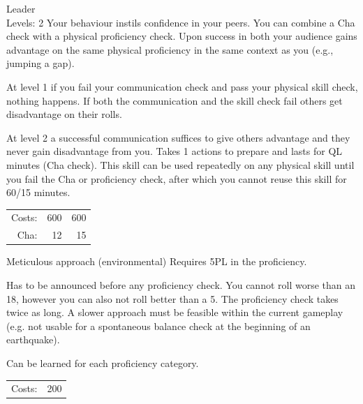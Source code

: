 \begin{skill}{Leader \\\phantom{a}\hfill Levels: 2}
	\setlength{\parskip}{8pt}
	\setlength{\parindent}{0pt}
	Your behaviour instils confidence in your peers. You can combine a Cha check with a physical proficiency check. Upon success in both your audience gains advantage on the same physical proficiency in the same context as you (e.g., jumping a gap).

	At level 1 if you fail your communication check and pass your physical skill check, nothing happens. If both the communication and the skill check fail others get disadvantage on their rolls.

	At level 2 a successful communication suffices to give others advantage and they never gain disadvantage from you. Takes 1 actions to prepare and lasts for QL minutes (Cha check). This skill can be used repeatedly on any physical skill until you fail the Cha or proficiency check, after which you cannot reuse this skill for 60/15 minutes.\\

	\hfill
	\begin{tabular}{rrr}
		Costs: & 600 & 600 \\
		Cha: & 12 & 15 \\
	\end{tabular}
\end{skill}

\begin{skill}{Meticulous approach (environmental)}
	\setlength{\parskip}{8pt}
	\setlength{\parindent}{0pt}
	Requires 5PL in the proficiency.

	Has to be announced before any proficiency check. You cannot roll worse than an 18, however you can also not roll better than a 5. The proficiency check takes twice as long. A slower approach must be feasible within the current gameplay (e.g. not usable for a spontaneous balance check at the beginning of an earthquake).

	Can be learned for each proficiency category.\\

	\hfill
	\begin{tabular}{rr}
		Costs: & 200 \\
	\end{tabular}
\end{skill}

